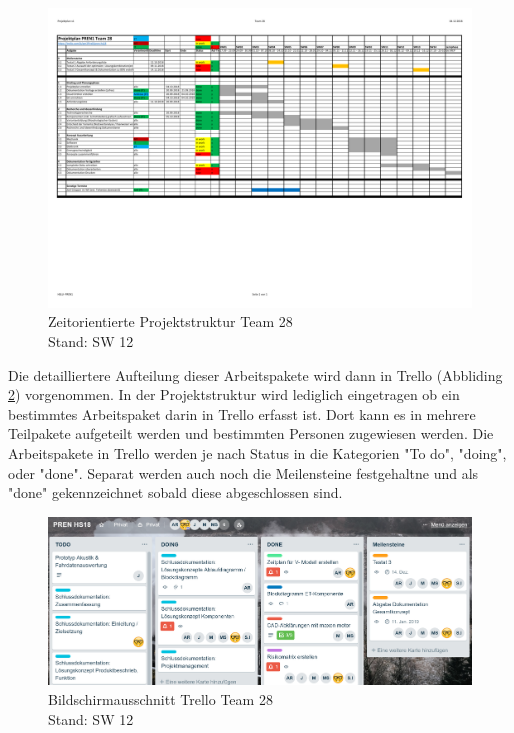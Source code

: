 \documentclass[../../main.tex]{subfiles}
\begin{document}
\begin{figure}[H] \centering
    \includegraphics[page=1,width=1\textwidth, trim=.6cm 7cm .6cm 1.5cm, clip]{Projektplanung.pdf}
    \caption{Zeitorientierte Projektstruktur Team 28\\Stand: SW 12}
    \label{fig:projektplanung}
\end{figure}

Die detailliertere Aufteilung dieser Arbeitspakete wird dann in Trello (Abbliding \ref{fig:screenTrello}) vorgenommen. In der Projektstruktur wird lediglich eingetragen ob ein bestimmtes Arbeitspaket darin in Trello erfasst ist. Dort kann es in mehrere Teilpakete aufgeteilt werden und bestimmten Personen zugewiesen werden. Die Arbeitspakete in Trello werden je nach Status in die Kategorien "To do", "doing", oder "done". Separat werden auch noch die Meilensteine festgehaltne und als "done" gekennzeichnet sobald diese abgeschlossen sind.\\

\begin{figure}[H] \centering
    \includegraphics[page=1,width=.8\textwidth]{screenTrello.png}
    \caption{Bildschirmausschnitt Trello Team 28\\Stand: SW 12}
    \label{fig:screenTrello}
\end{figure}
\pagebreak
\end{document}
